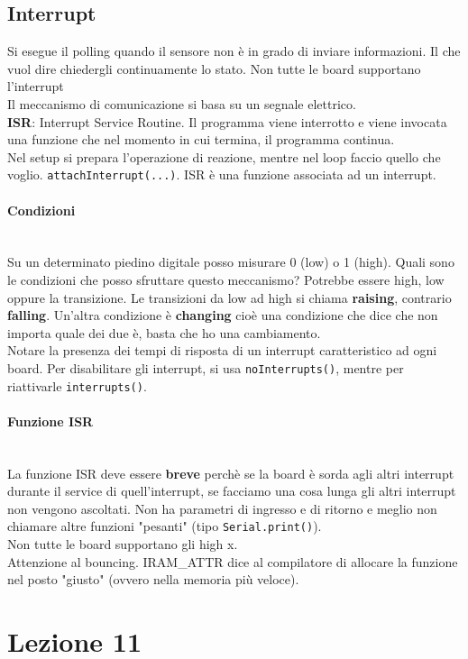 \documentclass{article}
\begin{document}
\subsection{Interrupt}
Si esegue il polling quando il sensore non è in grado di inviare informazioni. Il che vuol dire chiedergli continuamente lo stato. Non tutte le board supportano l'interrupt
\\ Il meccanismo di comunicazione si basa su un segnale elettrico.
\\ \textbf{ISR}: Interrupt Service Routine. Il programma viene interrotto e viene invocata una funzione che nel momento in cui termina, il programma continua.
\\ Nel setup si prepara l'operazione di reazione, mentre nel loop faccio quello che voglio. \texttt{attachInterrupt(...)}.
ISR è una funzione associata ad un interrupt.
\paragraph{Condizioni} \mbox{}
\\ Su un determinato piedino digitale posso misurare 0 (low) o 1 (high). Quali sono le condizioni che posso sfruttare questo meccanismo? Potrebbe essere high, low oppure la transizione. Le transizioni da low ad high si chiama \textbf{raising}, contrario \textbf{falling}. Un'altra condizione è \textbf{changing} cioè una condizione che dice che non importa quale dei due è, basta che ho una cambiamento.
\\ Notare la presenza dei tempi di risposta di un interrupt caratteristico ad ogni board.
Per disabilitare gli interrupt, si usa \texttt{noInterrupts()}, mentre per riattivarle \texttt{interrupts()}.
\paragraph{Funzione ISR} \mbox{}
\\ La funzione ISR deve essere \textbf{breve} perchè se la board è sorda agli altri interrupt durante il service di quell'interrupt, se facciamo una cosa lunga gli altri interrupt non vengono ascoltati. Non ha parametri di ingresso e di ritorno e meglio non chiamare altre funzioni "pesanti" (tipo \texttt{Serial.print()}).
\\ Non tutte le board supportano gli high x.
\\ Attenzione al bouncing. IRAM\_ATTR dice al compilatore di allocare la funzione nel posto "giusto" (ovvero nella memoria più veloce).
\section{Lezione 11}
\end{document}
